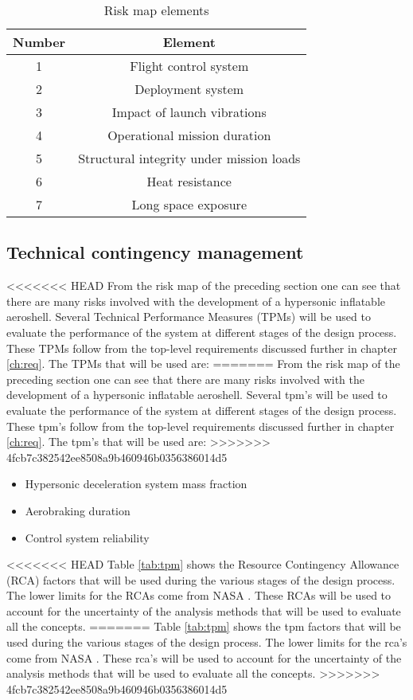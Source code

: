 \begin{table}[h]
\centering
\caption{Risk map elements}
\label{tab:riskelements}
\begin{tabular}{|c|c|}
\hline
\textbf{Number} & \textbf{Element} \\
\hline
1 & Flight control system\\
2 & Deployment system\\
3 & Impact of launch vibrations\\
4 & Operational mission duration\\
5 & Structural integrity under mission loads\\
6 & Heat resistance\\
7 & Long space exposure\\
\hline
\end{tabular}
\end{table}

\subsection{Technical contingency management}
\label{sec:tca}
<<<<<<< HEAD
From the risk map of the preceding section one can see that there are many risks involved with the development of a hypersonic inflatable aeroshell. Several Technical Performance Measures (TPMs) will be used to evaluate the performance of the system at different stages of the design process. These TPMs follow from the top-level requirements discussed further in chapter \ref{ch:req}. The TPMs that will be used are:
=======
From the risk map of the preceding section one can see that there are many risks involved with the development of a hypersonic inflatable aeroshell. Several \gls{tpm}'s  will be used to evaluate the performance of the system at different stages of the design process. These \gls{tpm}'s follow from the top-level requirements discussed further in chapter \ref{ch:req}. The \gls{tpm}'s that will be used are:
>>>>>>> 4fcb7c382542ee8508a9b460946b0356386014d5
\begin{itemize}
	\item Hypersonic deceleration system mass fraction
	\item Aerobraking duration
	\item Control system reliability
\end{itemize}
<<<<<<< HEAD
Table \ref{tab:tpm} shows the Resource Contingency Allowance (RCA) factors that will be used during the various stages of the design process. The lower limits for the RCAs come from NASA \cite{GoddardSpaceFlightCenter2013}. These RCAs will be used to account for the uncertainty of the analysis methods that will be used to evaluate all the concepts.
=======
Table \ref{tab:tpm} shows the \acrfull{tpm} factors that will be used during the various stages of the design process. The lower limits for the \gls{rca}'s come from NASA \cite{GoddardSpaceFlightCenter2013}. These \gls{rca}'s will be used to account for the uncertainty of the analysis methods that will be used to evaluate all the concepts.
>>>>>>> 4fcb7c382542ee8508a9b460946b0356386014d5

